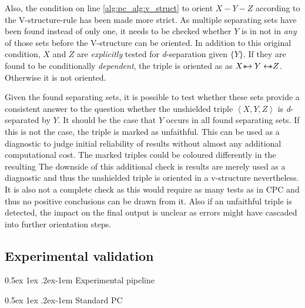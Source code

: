 \documentclass[a4paper, 10pt, english, onecolumn]{article}
\makeatletter
\def \srightarrow {\text{\textasteriskcentered}\hspace{-0.62em}\rightarrow}
\def \sleftarrow {\leftarrow\hspace{-0.62em}\text{\textasteriskcentered}}
\renewcommand{\paragraph}{%
  \@startsection{paragraph}{4}%
  {\z@}{0.5ex \@plus 1ex \@minus .2ex}{-1em}%
  {\normalfont\normalsize\bfseries}%
}
\makeatother
\begin{document}
Also, the condition on line \ref{alg:pc_alg:v_struct} to orient $X - Y - Z$ according to the V-structure-rule has been made more strict.
As multiple separating sets have been found instead of only one, it needs to be checked whether $Y$ is in not in \emph{any} of those sets before the V-structure can be oriented.
In addition to this original condition, $X$ and $Z$ are \textit{explicitly} tested for \textit{d}-separation given $\{Y\}$.
If they are found to be conditionally \textit{dependent}, the triple is oriented as as $X \srightarrow Y \sleftarrow Z$.
Otherwise it is not oriented.

Given the found separating sets, it is possible to test whether these sets provide a consistent answer to the question whether the unshielded triple $\left<X,Y,Z\right>$ is \textit{d}-separated by $Y$.
It should be the case that $Y$ occurs in all found separating sets.
If this is not the case, the triple is marked as unfaithful.
This can be used as a diagnostic to judge initial reliability of results without almost any additional computational cost.
The marked triples could be coloured differently in the resulting 
The downside of this additional check is results are merely used as a diagnostic and thus the unshielded triple is oriented in a v-structure nevertheless.
It is also not a complete check as this would require as many tests as in CPC and thus no positive conclusions can be drawn from it.
Also if an unfaithful triple is detected, the impact on the final output is unclear as errors might have cascaded into further orientation steps.

\subsection{Experimental validation}
\paragraph{Experimental pipeline}

\paragraph{Standard PC}
\end{document}
